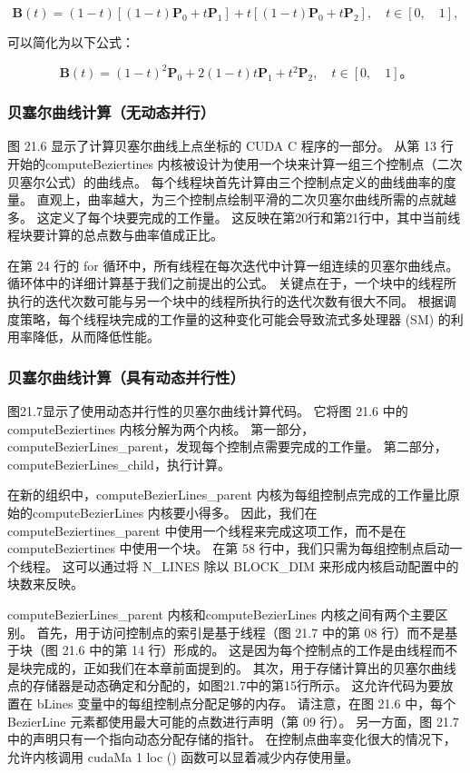 $$
\mathbf{B}(t)=(1-t)\left[(1-t) \mathbf{P}_{0}+t \mathbf{P}_{1}\right]+t\left[ (1-t) \mathbf{P}_{0}+t \mathbf{P}_{2}\right], \quad t \in[0, \quad 1],
$$

可以简化为以下公式：

$$
\mathbf{B}(t)=(1-t)^{2} \mathbf{P}_{0}+2(1-t) t \mathbf{P}_{1}+t^{2} \mathbf{P}_{2}, \quad t \in[0, \quad 1] 。
$$

\subsubsection{贝塞尔曲线计算（无动态并行）}
图 21.6 显示了计算贝塞尔曲线上点坐标的 CUDA C 程序的一部分。 从第 13 行开始的computeBeziertines 内核被设计为使用一个块来计算一组三个控制点（二次贝塞尔公式）的曲线点。 每个线程块首先计算由三个控制点定义的曲线曲率的度量。 直观上，曲率越大，为三个控制点绘制平滑的二次贝塞尔曲线所需的点就越多。 这定义了每个块要完成的工作量。 这反映在第20行和第21行中，其中当前线程块要计算的总点数与曲率值成正比。

在第 24 行的 for 循环中，所有线程在每次迭代中计算一组连续的贝塞尔曲线点。 循环体中的详细计算基于我们之前提出的公式。 关键点在于，一个块中的线程所执行的迭代次数可能与另一个块中的线程所执行的迭代次数有很大不同。 根据调度策略，每个线程块完成的工作量的这种变化可能会导致流式多处理器 (SM) 的利用率降低，从而降低性能。

\subsubsection{贝塞尔曲线计算（具有动态并行性）}
图21.7显示了使用动态并行性的贝塞尔曲线计算代码。 它将图 21.6 中的computeBeziertines 内核分解为两个内核。 第一部分，computeBezierLines\_parent，发现每个控制点需要完成的工作量。 第二部分，computeBezierLines\_child，执行计算。

在新的组织中，computeBezierLines\_parent 内核为每组控制点完成的工作量比原始的computeBezierLines 内核要小得多。 因此，我们在computeBeziertines\_parent 中使用一个线程来完成这项工作，而不是在computeBeziertines 中使用一个块。 在第 58 行中，我们只需为每组控制点启动一个线程。 这可以通过将 N\_LINES 除以 BLOCK\_DIM 来形成内核启动配置中的块数来反映。

computeBezierLines\_parent 内核和computeBezierLines 内核之间有两个主要区别。 首先，用于访问控制点的索引是基于线程（图 21.7 中的第 08 行）而不是基于块（图 21.6 中的第 14 行）形成的。 这是因为每个控制点的工作是由线程而不是块完成的，正如我们在本章前面提到的。 其次，用于存储计算出的贝塞尔曲线点的存储器是动态确定和分配的，如图21.7中的第15行所示。 这允许代码为要放置在 bLines 变量中的每组控制点分配足够的内存。 请注意，在图 21.6 中，每个 BezierLine 元素都使用最大可能的点数进行声明（第 09 行）。 另一方面，图 21.7 中的声明只有一个指向动态分配存储的指针。 在控制点曲率变化很大的情况下，允许内核调用 cudaMa 1 loc () 函数可以显着减少内存使用量。

